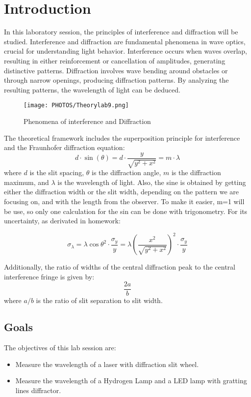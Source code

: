 \section{Introduction}
In this laboratory session, the principles of interference and diffraction will be studied. Interference and diffraction are fundamental phenomena in wave optics, crucial for understanding light behavior. Interference occurs when waves overlap, resulting in either reinforcement or cancellation of amplitudes, generating distinctive patterns. Diffraction involves wave bending around obstacles or through narrow openings, producing diffraction patterns. By analyzing the resulting patterns, the wavelength of light can be deduced.

\begin{figure}[H]
    \centering
    \texttt{[image: PHOTOS/Theorylab9.png]}
    \caption{Phenomena of interference and Diffraction}
    \label{fig: theory}
\end{figure}

The theoretical framework includes the superposition principle for interference and the Fraunhofer diffraction equation:
\begin{equation} \label{eq: theory}
    d \cdot \sin(\theta) = d \cdot \frac{y}{\sqrt{y^2+x^2}} = m \cdot \lambda
\end{equation}
where $d$ is the slit spacing, $\theta$ is the diffraction angle, $m$ is the diffraction maximum, and $\lambda$ is the wavelength of light. Also, the sine is obtained by getting either the diffraction width or the slit width, depending on the pattern we are focusing on, and with the length from the observer. To make it easier, m=1 will be use, so only one calculation for the sin can be done with trigonometry. For its uncertainty, as derivated in homework:

\begin{equation} \label{eq: uncer}
    \sigma_\lambda =\lambda \cos{\theta}^2 \cdot \frac{\sigma_y}{y} =\lambda \left(\frac{x^2}{\sqrt{y^2+x^2}} \right)^2 \cdot \frac{\sigma_y}{y} 
\end{equation}

Additionally, the ratio of widths of the central diffraction peak to the central interference fringe is given by:
\[
\frac{2a}{b}
\]
where $a/b$ is the ratio of slit separation to slit width.

\subsection{Goals}
\vspace*{-2mm}
The objectives of this lab session are:
\vspace*{-2 mm}
\begin{itemize}
\item  Measure the wavelength of a laser with diffraction slit wheel.
\item  Measure the wavelength of a Hydrogen Lamp and a LED lamp with gratting lines diffractor.
\end{itemize}
\vspace*{-4 mm}
